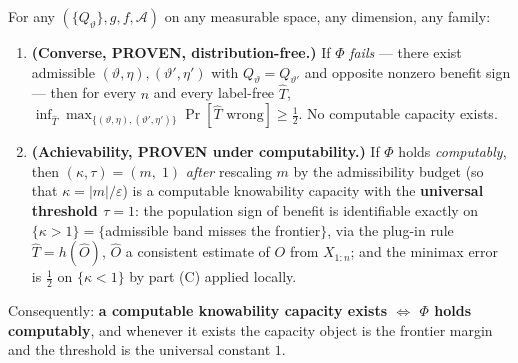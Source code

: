 \begin{theorem}
\label{thm:dich-main}
For any $(\{Q_\vartheta\},g,f,\mathcal A)$ on any measurable space, any dimension, any
family:
\begin{enumerate}\itemsep2pt
\item[\textnormal{(C)}] \textbf{(Converse, PROVEN, distribution-free.)} If $\Phi$
\emph{fails} --- there exist admissible $(\vartheta,\eta),(\vartheta',\eta')$ with
$Q_\vartheta=Q_{\vartheta'}$ and opposite nonzero benefit sign --- then for every $n$
and every label-free $\hat T$,
$\inf_{\hat T}\max_{\{(\vartheta,\eta),(\vartheta',\eta')\}}\Pr[\hat T\text{ wrong}]
   \ge\tfrac12$. No computable capacity exists.
\item[\textnormal{(A)}] \textbf{(Achievability, PROVEN under computability.)} If
$\Phi$ holds \emph{computably}, then $(\kappa,\tau)=(m,\;1)$ \emph{after} rescaling
$m$ by the admissibility budget (so that $\kappa=|m|/\varepsilon$) is a computable
knowability capacity with the \textbf{universal threshold $\tau=1$}: the population
sign of benefit is identifiable exactly on $\{\kappa>1\}=\{$admissible band misses the
frontier$\}$, via the plug-in rule $\hat T=h(\hat O)$, $\hat O$ a consistent estimate
of $O$ from $X_{1:n}$; and the minimax error is $\tfrac12$ on $\{\kappa<1\}$ by part
(C) applied locally.
\end{enumerate}
Consequently: \textbf{a computable knowability capacity exists $\iff$ $\Phi$ holds
computably}, and whenever it exists the capacity object is the frontier margin and
the threshold is the universal constant $1$.
\end{theorem}

